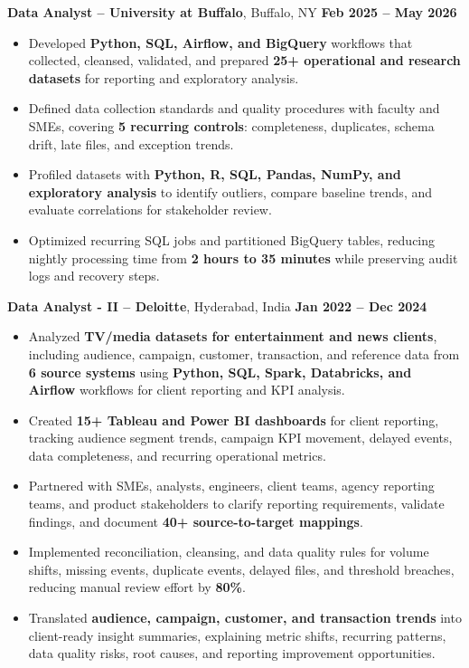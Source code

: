\documentclass[letterpaper,11pt]{article}
\begin{document}
\textbf{Data Analyst -- University at Buffalo}, Buffalo, NY \hfill \textbf{Feb 2025 -- May 2026}\\[-1pt]
\begin{itemize}
    \item Developed \textbf{Python, SQL, Airflow, and BigQuery} workflows that collected, cleansed, validated, and prepared \textbf{25+ operational and research datasets} for reporting and exploratory analysis.
    \item Defined data collection standards and quality procedures with faculty and SMEs, covering \textbf{5 recurring controls}: completeness, duplicates, schema drift, late files, and exception trends.
    \item Profiled datasets with \textbf{Python, R, SQL, Pandas, NumPy, and exploratory analysis} to identify outliers, compare baseline trends, and evaluate correlations for stakeholder review.
    \item Optimized recurring SQL jobs and partitioned BigQuery tables, reducing nightly processing time from \textbf{2 hours to 35 minutes} while preserving audit logs and recovery steps.
\end{itemize}

\vspace{1pt}

\textbf{Data Analyst - II -- Deloitte}, Hyderabad, India \hfill \textbf{Jan 2022 -- Dec 2024}\\[-1pt]
\begin{itemize}
    \item Analyzed \textbf{TV/media datasets for entertainment and news clients}, including audience, campaign, customer, transaction, and reference data from \textbf{6 source systems} using \textbf{Python, SQL, Spark, Databricks, and Airflow} workflows for client reporting and KPI analysis.
    \item Created \textbf{15+ Tableau and Power BI dashboards} for client reporting, tracking audience segment trends, campaign KPI movement, delayed events, data completeness, and recurring operational metrics.
    \item Partnered with SMEs, analysts, engineers, client teams, agency reporting teams, and product stakeholders to clarify reporting requirements, validate findings, and document \textbf{40+ source-to-target mappings}.
    \item Implemented reconciliation, cleansing, and data quality rules for volume shifts, missing events, duplicate events, delayed files, and threshold breaches, reducing manual review effort by \textbf{80\%}.
    \item Translated \textbf{audience, campaign, customer, and transaction trends} into client-ready insight summaries, explaining metric shifts, recurring patterns, data quality risks, root causes, and reporting improvement opportunities.
\end{itemize}
\end{document}
